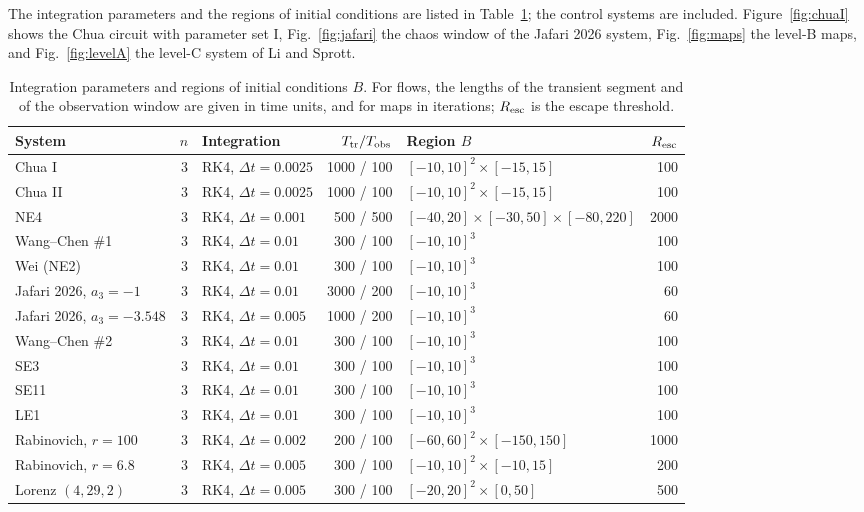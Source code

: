 The integration parameters and the regions of initial conditions are listed in Table~\ref{tab:integration}; the control systems are included. Figure~\ref{fig:chuaI} shows the Chua circuit with parameter set I, Fig.~\ref{fig:jafari} the chaos window of the Jafari 2026 system, Fig.~\ref{fig:maps} the level-B maps, and Fig.~\ref{fig:levelA} the level-C system of Li and Sprott.

\begin{table}
\caption{Integration parameters and regions of initial conditions $B$. For flows, the lengths of the transient segment and of the observation window are given in time units, and for maps in iterations; $R_{\rm esc}$ is the escape threshold.}
\label{tab:integration}
\begin{ruledtabular}
\begin{tabular}{lrlrlr}
System & $n$ & Integration & $T_{\rm tr}/T_{\rm obs}$ & Region $B$ & $R_{\rm esc}$ \\
\hline
Chua I & 3 & RK4, $\Delta t=0.0025$ & 1000 / 100 & $[-10,10]^2\times[-15,15]$ & 100 \\
Chua II & 3 & RK4, $\Delta t=0.0025$ & 1000 / 100 & $[-10,10]^2\times[-15,15]$ & 100 \\
NE4 & 3 & RK4, $\Delta t=0.001$ & 500 / 500 & $[-40,20]\times[-30,50]\times[-80,220]$ & 2000 \\
Wang--Chen \#1 & 3 & RK4, $\Delta t=0.01$ & 300 / 100 & $[-10,10]^3$ & 100 \\
Wei (NE2) & 3 & RK4, $\Delta t=0.01$ & 300 / 100 & $[-10,10]^3$ & 100 \\
Jafari 2026, $a_3=-1$ & 3 & RK4, $\Delta t=0.01$ & 3000 / 200 & $[-10,10]^3$ & 60 \\
Jafari 2026, $a_3=-3.548$ & 3 & RK4, $\Delta t=0.005$ & 1000 / 200 & $[-10,10]^3$ & 60 \\
Wang--Chen \#2 & 3 & RK4, $\Delta t=0.01$ & 300 / 100 & $[-10,10]^3$ & 100 \\
SE3 & 3 & RK4, $\Delta t=0.01$ & 300 / 100 & $[-10,10]^3$ & 100 \\
SE11 & 3 & RK4, $\Delta t=0.01$ & 300 / 100 & $[-10,10]^3$ & 100 \\
LE1 & 3 & RK4, $\Delta t=0.01$ & 300 / 100 & $[-10,10]^3$ & 100 \\
Rabinovich, $r=100$ & 3 & RK4, $\Delta t=0.002$ & 200 / 100 & $[-60,60]^2\times[-150,150]$ & 1000 \\
Rabinovich, $r=6.8$ & 3 & RK4, $\Delta t=0.005$ & 300 / 100 & $[-10,10]^2\times[-10,15]$ & 200 \\
Lorenz $(4,29,2)$ & 3 & RK4, $\Delta t=0.005$ & 300 / 100 & $[-20,20]^2\times[0,50]$ & 500 \\

\end{tabular}
\end{ruledtabular}
\end{table}

